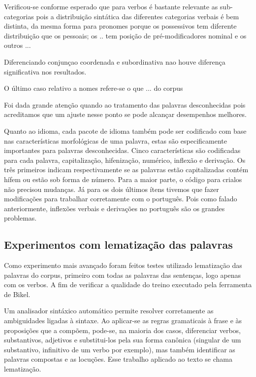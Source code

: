 Verificou-se conforme esperado que para verbos é bastante relevante as sub-categorias pois a distribuição sintática das diferentes categorias verbais é bem distinta, da mesma forma para pronomes porque os possessivos tem diferente distribuição que os pessoais; os .. tem posição de pré-modificadores nominal e os outros ...

Diferenciando conjunçao coordenada e subordinativa nao houve diferença significativa nos resultados.

O último caso relativo a nomes refere-se  o que ... do corpus 

Foi dada grande atenção quando ao tratamento das palavras desconhecidas pois acreditamos que um ajuste nesse ponto se pode alcançar desempenhos melhores.

Quanto ao idioma, cada pacote de idioma também pode ser codificado com base nas características morfológicas de uma palavra, estas são especificamente importantes para palavras desconhecidas. Cinco características são codificadas para cada palavra, capitalização, hifenização, numérico, inflexão e derivação. Os três primeiros indicam respectivamente se as palavras estão capitalizadas contém hífem ou estão sob forma de número. Para a maior parte, o código para crialos não precisou mudanças. Já para os dois últimos ítens tivemos que fazer modificações para trabalhar corretamente com o português. Pois como falado anteriormente, inflexões verbais e derivações no português são os grandes problemas.


\subsection{Experimentos com lematização das palavras}
\label{sec:lematizacao}

Como experimento mais avançado foram feitos testes utilizado lematização das palavras do corpus, primeiro com todas as palavras das sentenças, logo apenas com os verbos. A fim de verificar a qualidade do treino executado pela ferramenta de Bikel.

Um analisador sintáxico automático permite resolver corretamente as ambiguidades ligadas à sintaxe. Ao aplicar-se as
regras gramaticais à frase e às proposições que a compõem, pode-se, na maioria dos casos, diferenciar verbos,
substantivos, adjetivos e substitui-los pela sua forma canônica (singular de um substantivo, infinitivo de um verbo por
exemplo), mas também identificar as palavras compostas e as locuções. Esse trabalho aplicado ao texto se chama
lematização.


